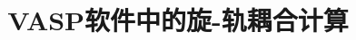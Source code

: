 \documentclass[10pt, oneside, a4paper]{article}      %
\title{VASP软件中的旋-轨耦合计算}   %
\author[]{ }   %
\date{} %
\begin{document}

%
\renewcommand{\abstractname}{\small{\CJKfamily{hei} 摘\quad 要}} %
\renewcommand{\refname}{\centering\CJKfamily{hei} 参考文献}
\renewcommand{\figurename}{{\bf Fig}.}
\renewcommand{\tablename}{{\bf Tab}.}

\makeatletter
\long{}
\makeatother

\newcommand{\keywords}[1]{{\hspace{0pt}\small{\CJKfamily{hei} 关键词:}{\hspace{2ex}{#1}}\bigskip}}

\end{document}
